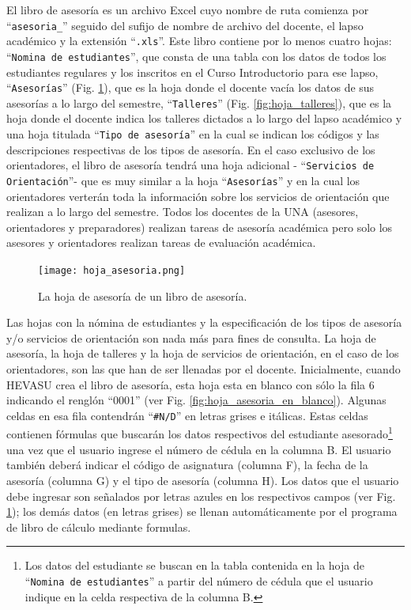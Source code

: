 \documentclass[letterpaper,12pt]{book}
\begin{document}
El libro de asesoría es un archivo Excel cuyo nombre de ruta comienza por ``\texttt{asesoria\_}'' seguido del sufijo de nombre de archivo del docente, el lapso académico y la extensión ``\texttt{.xls}''. Este libro contiene por lo menos cuatro hojas: ``\texttt{Nomina de estudiantes}'', que consta de una tabla con los datos de todos los estudiantes regulares y los inscritos en el Curso Introductorio para ese lapso, ``\texttt{Asesorías}'' (Fig. \ref{fig:hoja_asesoria}), que es la hoja donde el docente vacía los datos de sus asesorías a lo largo del semestre, ``\texttt{Talleres}'' (Fig. \ref{fig:hoja_talleres}), que es la hoja donde el docente indica los talleres dictados a lo largo del lapso académico y una hoja titulada ``\texttt{Tipo de asesoría}'' en la cual se indican los códigos y las descripciones respectivas de los tipos de asesoría. En el caso exclusivo de los orientadores, el libro de asesoría tendrá una hoja adicional - ``\texttt{Servicios de Orientación}''- que es muy similar a la hoja ``\texttt{Asesorías}'' y en la cual los orientadores verterán toda la información sobre los servicios de orientación que realizan a lo largo del semestre. Todos los docentes de la UNA (asesores, orientadores y preparadores) realizan tareas de asesoría académica pero solo los asesores y orientadores realizan tareas de evaluación académica.

\begin{figure}[!ht]
  \centering
  \texttt{[image: hoja\_asesoria.png]}
  \caption{La hoja de asesoría de un libro de asesoría.}
  \label{fig:hoja_asesoria}
\end{figure}

Las hojas con la nómina de estudiantes y la especificación de los tipos de asesoría y/o servicios de orientación son nada más para fines de consulta. La hoja de asesoría, la hoja de talleres y la hoja de servicios de orientación, en el caso de los orientadores, son las que han de ser llenadas por el docente.  Inicialmente, cuando HEVASU crea el libro de asesoría, esta hoja esta en blanco con sólo la fila 6 indicando el renglón ``0001'' (ver Fig. \ref{fig:hoja_asesoria_en_blanco}). Algunas celdas en esa fila contendrán ``\texttt{\#N/D}'' en letras grises e itálicas. Estas celdas contienen fórmulas que buscarán los datos respectivos del estudiante asesorado\footnote{Los datos del estudiante se buscan en la tabla contenida en la hoja de ``\texttt{Nomina de estudiantes}'' a partir del número de cédula que el usuario indique en la celda respectiva de la columna B.} una vez que el usuario ingrese el número de cédula en la columna B. El usuario también deberá indicar el código de asignatura (columna F), la fecha de la asesoría (columna G) y el tipo de asesoría (columna H).  Los datos que el usuario debe ingresar son señalados por letras azules en los respectivos campos (ver Fig. \ref{fig:hoja_asesoria}); los demás datos (en letras grises) se llenan automáticamente por el programa de libro de cálculo mediante formulas.    
\end{document}
